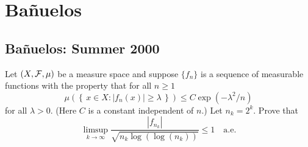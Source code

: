 \section{Bañuelos}
\subsection{Bañuelos: Summer 2000}
\setcounter{exercise}{0}
\setcounter{equation}{0}
\begin{problem}
  Let $(X,\mathcal{F},\mu)$ be a measure space and suppose $\{f_n\}$ is a
  sequence of measurable functions with the property that for all
  $n\geq 1$
  \[
    \mu\left(\left\{\,x\in X:|f_n(x)|\geq\lambda\,\right\}\right)\leq C
    \exp(-\lambda^2/n)
  \]
  for all $\lambda>0$. (Here $C$ is a constant independent of $n$.) Let
  $n_k=2^k$. Prove that
  \[
    \limsup_{k\to\infty}\frac{|f_{n_k}|}{\sqrt{n_k\log(\log(n_k))}}\leq
    1\quad\text{a.e.}
  \]
\end{problem}
